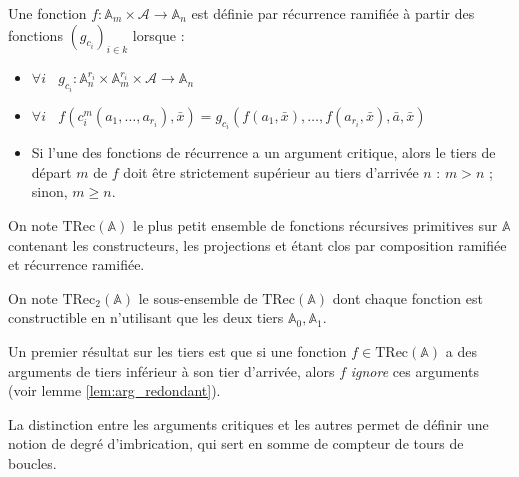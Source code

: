 \documentclass{report}
\newcommand{\bbA}{\mathbb{A}}
\newcommand{\TRec}[1]{\text{TRec}\left(\mathbb{#1}\right)}
\newcommand{\TRecd}[1]{\text{TRec}_{2}\left(\mathbb{#1}\right)}
\begin{document}
			
			\begin{definition}
				Une fonction $f: \bbA_m \times \mathcal{A} \to \bbA_n$ est définie par récurrence ramifiée à partir des fonctions $\left( g_{c_i} \right)_{i\in k}$ lorsque :
				
				\begin{itemize}
					\item 	$\forall i \:\:\:\: g_{c_i} : \bbA_n^{r_i} \times \bbA_m^{r_i} \times \mathcal{A} \to \bbA_n$
					
					\item 	$\forall i \:\:\:\:
					f(c_i^m(a_1, \dots, a_{r_i}), \bar{x}) 
					= g_{c_i}\left( f(a_1, \bar{x}), \dots, f(a_{r_i}, \bar{x}), \bar{a}, \bar{x} \right)
					$
					
					\item 	Si l'une des fonctions de récurrence a un argument critique, alors le tiers de départ $m$ de $f$ doit être strictement supérieur au tiers d'arrivée $n$ : $m > n$ ; sinon, $m \geqslant n$.
				\end{itemize}
			\end{definition}
			
			
			
			\begin{definition} 
				\label{def:TRecA}
				On note $\TRec{A}$ le plus petit ensemble de fonctions récursives primitives sur $\bbA$ contenant les constructeurs, les projections et étant clos par composition ramifiée et récurrence ramifiée.

				On note $\TRecd{A}$ le sous-ensemble de $\TRec{A}$ dont chaque fonction est constructible en n'utilisant que les deux tiers $\bbA_0, \bbA_1$.
			\end{definition}
			
			Un premier résultat sur les tiers est que si une fonction $f \in \TRec{\bbA}$ a des arguments de tiers inférieur à son tier d'arrivée, alors $f$ \emph{ignore} ces arguments (voir lemme \ref{lem:arg_redondant}).
			
			La distinction entre les arguments critiques et les autres permet de définir une notion de degré d'imbrication, qui sert en somme de compteur de tours de boucles. 
			
\end{document}
